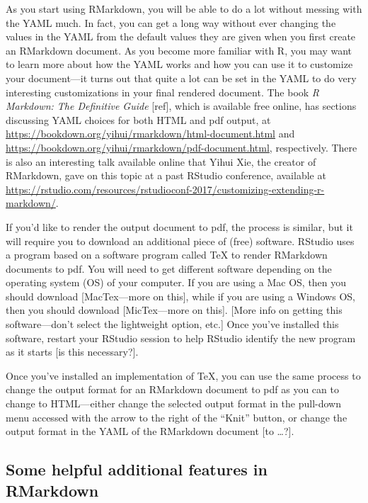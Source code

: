 \documentclass[]{tufte-book}
\begin{document}
As you start using RMarkdown, you will be able to do a lot without messing with the
YAML much. In fact, you can get a long way without ever changing the values
in the YAML from the default values they are given when you first create an
RMarkdown document. As you become more familiar with R, you may want to learn
more about how the YAML works and how you can use it to customize your
document---it turns out that quite a lot can be set in the YAML to do very
interesting customizations in your final rendered document. The book
\emph{R Markdown: The Definitive Guide} {[}ref{]}, which is available free online, has
sections discussing YAML choices for both HTML and pdf output, at
\url{https://bookdown.org/yihui/rmarkdown/html-document.html} and
\url{https://bookdown.org/yihui/rmarkdown/pdf-document.html}, respectively. There is
also an interesting talk available online that Yihui Xie, the creator of RMarkdown,
gave on this topic at a past RStudio conference, available at
\url{https://rstudio.com/resources/rstudioconf-2017/customizing-extending-r-markdown/}.

If you'd like to render the output document to pdf, the process is similar, but
it will require you to download an additional piece of (free) software. RStudio
uses a program based on a software program called TeX to render RMarkdown
documents to pdf. You will need to get different software depending on the
operating system (OS) of your computer. If you are using a Mac OS, then you should
download {[}MacTex---more on this{]}, while if you are using a Windows OS, then you
should download {[}MicTex---more on this{]}. {[}More info on getting this software---don't
select the lightweight option, etc.{]} Once you've installed this software, restart
your RStudio session to help RStudio identify the new program as it starts
{[}is this necessary?{]}.

Once you've installed an implementation of TeX, you can use the same process
to change the output format for an RMarkdown document to pdf as you can to change
to HTML---either change the selected output format in the pull-down menu accessed
with the arrow to the right of the ``Knit'' button, or change the output format
in the YAML of the RMarkdown document {[}to \ldots?{]}.

\hypertarget{some-helpful-additional-features-in-rmarkdown}{%
\subsection{Some helpful additional features in RMarkdown}\label{some-helpful-additional-features-in-rmarkdown}}
\end{document}
